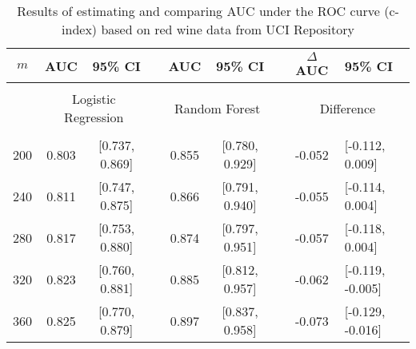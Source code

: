 \documentclass[12pt]{article}
\begin{document}
\begin{table}[ht]{
\centering
\setlength{\tabcolsep}{3pt}
\renewcommand{\arraystretch}{0.5}
\begin{tabular}{ ccc c cc c cl}
$m$   &  AUC     &  95\% CI    && AUC & 95\% CI &&  $\Delta$ AUC & 95\% CI  \\
\hline\\
    & \multicolumn{2}{c}{Logistic Regression} && \multicolumn{2}{c}{Random Forest} && \multicolumn{2}{c}{Difference} \\
    \cline{2-3} \cline{5-6} \cline{8-9}\\
200 &  0.803  & [0.737, 0.869] && 0.855 & [0.780, 0.929] && -0.052 & [-0.112, 0.009] \\
240 &  0.811  & [0.747, 0.875] && 0.866 & [0.791, 0.940] && -0.055 & [-0.114, 0.004]\\
280 &  0.817  & [0.753, 0.880] && 0.874 & [0.797, 0.951] && -0.057 & [-0.118, 0.004]\\
320 &  0.823  & [0.760, 0.881] && 0.885 & [0.812, 0.957] && -0.062 & [-0.119, -0.005]\\
360 &  0.825  & [0.770, 0.879] && 0.897 & [0.837, 0.958] && -0.073 & [-0.129, -0.016]
\end{tabular} 
\caption{Results of  estimating and comparing AUC under the ROC curve (c-index) based on red wine data from UCI Repository}\label{tab:example2b}}
\end{table} 


\end{document}
